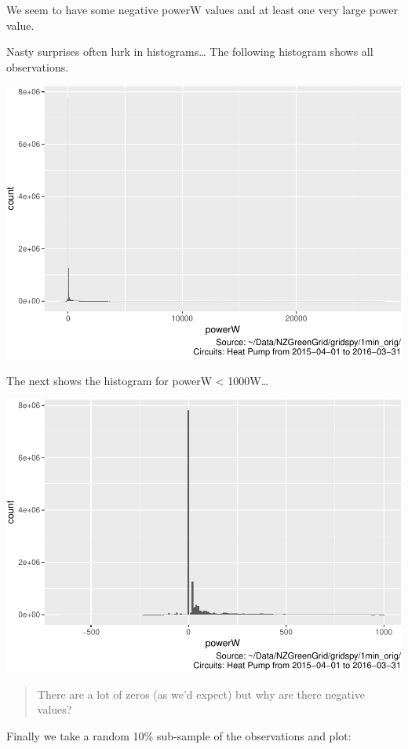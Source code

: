 \documentclass[]{article}
\begin{document}
We seem to have some negative powerW values and at least one very large
power value.

Nasty surprises often lurk in histograms\ldots{} The following histogram
shows all observations.

\includegraphics{ggHeatPumpProfiles_files/figure-latex/histo full-1.pdf}

The next shows the histogram for powerW \textless{} 1000W\ldots{}

\includegraphics{ggHeatPumpProfiles_files/figure-latex/histo power under 1000-1.pdf}

\begin{quote}
There are a lot of zeros (as we'd expect) but why are there negative
values?
\end{quote}

Finally we take a random 10\% sub-sample of the observations and plot:
\end{document}
